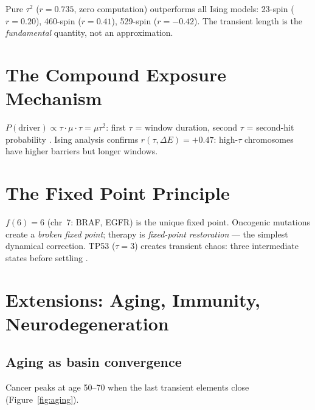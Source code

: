 \documentclass[11pt,a4paper]{article}
\begin{document}
Pure $\tau^2$ ($r = 0.735$, zero computation) outperforms all Ising models: 23-spin ($r = 0.20$), 460-spin ($r = 0.41$), 529-spin ($r = -0.42$). The transient length is the \emph{fundamental} quantity, not an approximation.

\section{The Compound Exposure Mechanism}

$P(\text{driver}) \propto \tau \cdot \mu \cdot \tau = \mu \tau^2$: first $\tau$ = window duration, second $\tau$ = second-hit probability \citep{Knudson1971}. Ising analysis confirms $r(\tau, \Delta E) = +0.47$: high-$\tau$ chromosomes have higher barriers but longer windows.

\section{The Fixed Point Principle}
\label{sec:fixedpoint}

$f(6) = 6$ (chr~7: BRAF, EGFR) is the unique fixed point. Oncogenic mutations create a \emph{broken fixed point}; therapy is \emph{fixed-point restoration} --- the simplest dynamical correction. TP53 ($\tau = 3$) creates transient chaos: three intermediate states before settling \citep{Bykov2018}.

\section{Extensions: Aging, Immunity, Neurodegeneration}

\subsection{Aging as basin convergence}

Cancer peaks at age 50--70 when the last transient elements close (Figure~\ref{fig:aging}).
\end{document}
